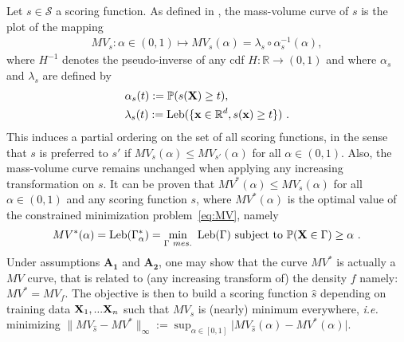 Let $s\in \mathcal{S}$ a scoring function. As defined in \cite{CLEM13,CLEM14}, the mass-volume curve of $s$ is the plot of the mapping 
\begin{align*}
MV_s : \alpha\in (0,1)\mapsto MV_s(\alpha) = \lambda_s \circ \alpha_s^{-1}(\alpha),
\end{align*}
where $H^{-1}$ denotes the pseudo-inverse of any cdf $H:\mathbb{R}\rightarrow (0,1)$ and where $\alpha_s$ and $\lambda_s$ are defined by
\begin{equation}
\begin{aligned}
\label{resume_fr:eq:alpha_beta}
&\alpha_s(t):= \mathbb{P}(s(\mathbf X) \ge t), \\
&\lambda_s(t):=\text{Leb}(\{\mathbf x \in \mathbb{R}^d, s(\mathbf x) \ge t\})~.
\end{aligned}
\end{equation}
%
This induces a partial ordering on the set of all scoring functions, in the sense that $s$ is
preferred to $s'$ if $MV_{s}(\alpha) \le MV_{s'}(\alpha)$ for all
$\alpha\in(0,1)$. Also, the mass-volume curve remains unchanged when applying any increasing transformation on $s$.
It can be proven that $MV^*(\alpha)\leq MV_s(\alpha)$ for all $\alpha\in (0,1)$ and any scoring function $s$, where $MV^*(\alpha)$ is the optimal value of the constrained minimization problem~\eqref{eq:MV}, namely
%
\begin{align}
\label{resume_fr:def:MV}
MV^*(\alpha)= \text{Leb}(\Gamma_\alpha^*)=\min_{\Gamma~ mes.} ~\text{Leb}(\Gamma) \mbox{~subject to~} \mathbb{P}(\mathbf X \in \Gamma) \ge \alpha~.
\end{align}
%
Under assumptions $\mathbf{A_1}$ and $\mathbf{A_2}$, one may show that the curve $MV^*$ is actually a $MV$ curve, that is related to (any increasing transform of) the density $f$ namely: $MV^*=MV_f$. 
The objective is then to build a scoring function $\hat s$ depending on training data $\mathbf X_1,...\mathbf X_n$ such that $MV_{\hat s}$ is (nearly) minimum everywhere, \textit{i.e.} minimizing $\|MV_{\hat s}-MV^*\|_{\infty}:=\sup_{\alpha\in[0,1]}\vert MV_{\hat s}(\alpha)-MV^*(\alpha)\vert$.

